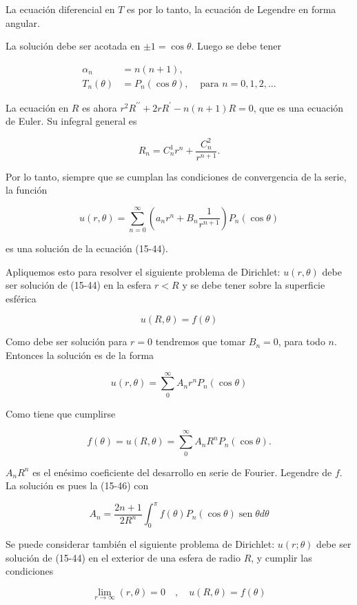 \documentclass[10pt]{article}
\theoremstyle{plain}
\theoremstyle{definition}
\theoremstyle{remark}
\begin{document}
La ecuación diferencial en $T$ es por lo tanto, la ecuación de Legendre en forma angular.

La solución debe ser acotada en $\pm 1=\cos \theta$. Luego se debe tener

$$
\begin{array}{rlr}
\alpha_{n} & =n(n+1), & \\
T_{n}(\theta) & =P_{n}(\cos \theta), & \text { para } n=0,1,2, \ldots
\end{array}
$$

La ecuación en $R$ es ahora $r^{2} R^{\prime \prime}+2 r R^{\prime}-n(n+1) R=0$, que es una ecuación de Euler. Su infegral general es

$$
R_{n}=C_{n}^{1} r^{n}+\frac{C_{n}^{2}}{r^{n+1}} .
$$

Por lo tanto, siempre que se cumplan las condiciones de convergencia de la serie, la función


\begin{equation*}
u(r, \theta)=\sum_{n=0}^{\infty}\left(a_{n} r^{n}+B_{n} \frac{1}{r^{n+1}}\right) P_{n}(\cos \theta) \tag{15-45}
\end{equation*}


es una solución de la ecuación (15-44).

Apliquemos esto para resolver el siguiente problema de Dirichlet: $u(r, \theta)$ debe ser solución de (15-44) en la esfera $r<R$ y se debe tener sobre la superficie esférica

$$
u(R, \theta)=f(\theta)
$$

Como debe ser solución para $r=0$ tendremos que tomar $B_{n}=0$, para todo $n$. Entonces la solución es de la forma

$$
u(r, \theta)=\sum_{0}^{\infty} A_{n} r^{n} P_{n}(\cos \theta)
$$

Como tiene que cumplirse


$$
f(\theta)=u(R, \theta)=\sum_{0}^{\infty} A_{n} R^{n} P_{n}(\cos \theta) .
$$

$A_{n} R^{n}$ es el enésimo coeficiente del desarrollo en serie de Fourier. Legendre de $f$. La solución es pues la (15-46) con

$$
A_{n}=\frac{2 n+1}{2 R^{n}} \int_{0}^{\pi} f(\theta) P_{n}(\cos \theta) \operatorname{sen} \theta d \theta
$$

Se puede considerar también el siguiente problema de Dirichlet: $u(r ; \theta)$ debe ser solución de (15-44) en el exterior de una esfera de radio $R$, y cumplir las condiciones

$$
\lim _{r \rightarrow \infty}(r, \theta)=0 \quad, \quad u(R, \theta)=f(\theta)
$$
\end{document}
